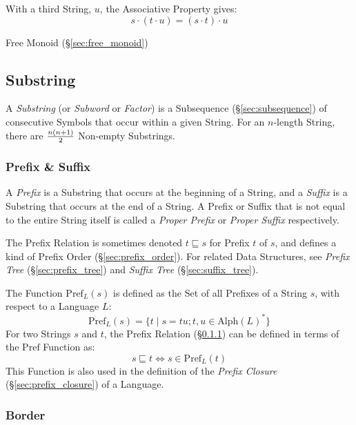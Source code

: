 With a third String, $u$, the Associative Property gives:
\[
  s \cdot (t \cdot u) = (s \cdot t) \cdot u
\]

Free Monoid (\S\ref{sec:free_monoid})



\subsection{Substring}\label{sec:substring}

A \emph{Substring} (or \emph{Subword} or \emph{Factor}) is a Subsequence
(\S\ref{sec:subsequence}) of consecutive Symbols that occur within a given
String. For an $n$-length String, there are $n(n+1) \over 2$ Non-empty
Substrings.



\subsubsection{Prefix \& Suffix}\label{sec:prefix_suffix}

A \emph{Prefix} is a Substring that occurs at the beginning of a String, and a
\emph{Suffix} is a Substring that occurs at the end of a String. A Prefix or
Suffix that is not equal to the entire String itself is called a \emph{Proper
  Prefix} or \emph{Proper Suffix} respectively.

The Prefix Relation is sometimes denoted $t \sqsubseteq s$ for Prefix $t$ of
$s$, and defines a kind of Prefix Order (\S\ref{sec:prefix_order}). For related
Data Structures, see \emph{Prefix Tree} (\S\ref{sec:prefix_tree}) and
\emph{Suffix Tree} (\S\ref{sec:suffix_tree}).

The Function $\mathrm{Pref}_L(s)$ is defined as the Set of all Prefixes of a
String $s$, with respect to a Language $L$:
\[
  \mathrm{Pref}_L(s) =
    \{ t\;|\;s = tu; t,u \in \mathrm{Alph}(L)^* \}
\]
For two Strings $s$ and $t$, the Prefix Relation (\S\ref{sec:prefix_suffix}) can
be defined in terms of the $\mathrm{Pref}$ Function as:
\[
  s \sqsubseteq t \Leftrightarrow s \in \mathrm{Pref}_L(t)
\]
This Function is also used in the definition of the \emph{Prefix Closure}
(\S\ref{sec:prefix_closure}) of a Language.



\subsubsection{Border}\label{sec:string_border}


